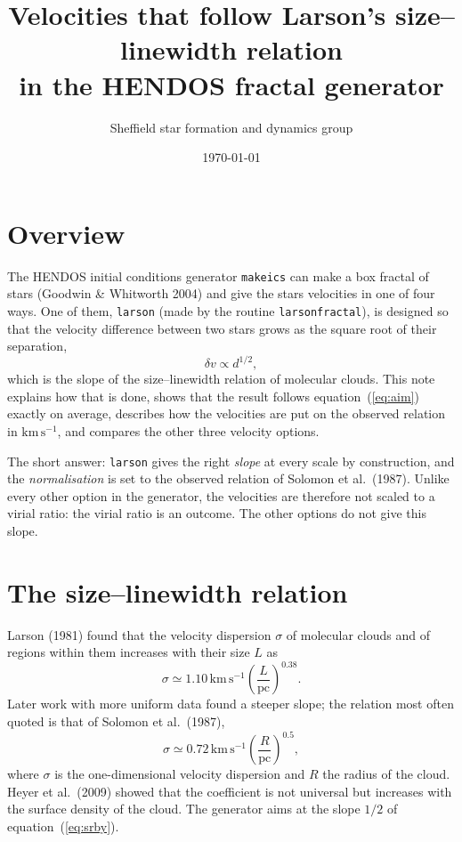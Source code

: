 \documentclass[11pt,a4paper]{article}
\title{Velocities that follow Larson's size--linewidth relation\\
in the HENDOS fractal generator}
\author{Sheffield star formation and dynamics group}
\date{\today}
\newcommand{\kms}{\mathrm{km\,s^{-1}}}
\begin{document}
\maketitle

\section{Overview}

The HENDOS initial conditions generator \texttt{makeics} can make a box
fractal of stars (Goodwin \& Whitworth 2004) and give the stars
velocities in one of four ways. One of them, \texttt{larson}
(made by the routine \texttt{larsonfractal}), is designed so that the
velocity difference between two stars grows as the square root of their
separation,
\begin{equation}
  \delta v \propto d^{1/2},
  \label{eq:aim}
\end{equation}
which is the slope of the size--linewidth relation of molecular clouds.
This note explains how that is done, shows that the result follows
equation~(\ref{eq:aim}) exactly on average, describes how the velocities
are put on the observed relation in $\kms$, and compares the other three
velocity options.

The short answer: \texttt{larson} gives the right \emph{slope} at every
scale by construction, and the \emph{normalisation} is set to the
observed relation of Solomon et al.\ (1987). Unlike every other option
in the generator, the velocities are therefore not scaled to a virial
ratio: the virial ratio is an outcome. The other options do not give
this slope.

\section{The size--linewidth relation}

Larson (1981) found that the velocity dispersion $\sigma$ of molecular
clouds and of regions within them increases with their size $L$ as
\begin{equation}
  \sigma \simeq 1.10\,\kms\left(\frac{L}{\mathrm{pc}}\right)^{0.38}.
\end{equation}
Later work with more uniform data found a steeper slope; the relation
most often quoted is that of Solomon et al.\ (1987),
\begin{equation}
  \sigma \simeq 0.72\,\kms\left(\frac{R}{\mathrm{pc}}\right)^{0.5},
  \label{eq:srby}
\end{equation}
where $\sigma$ is the one-dimensional velocity dispersion and $R$ the
radius of the cloud. Heyer et al.\ (2009) showed that the coefficient is
not universal but increases with the surface density of the cloud. The
generator aims at the slope $1/2$ of equation~(\ref{eq:srby}).
\end{document}
